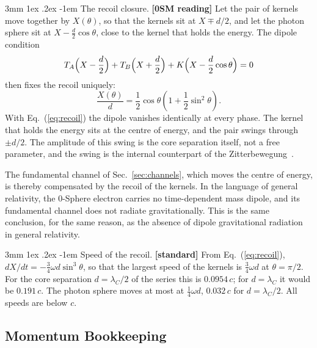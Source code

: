 \documentclass[%
 reprint, amsmath,amssymb, aps, prb, ]{revtex4-2}
\makeatletter
\numberwithin{equation}{section}
\renewcommand\paragraph{%
  \@startsection{paragraph}{4}{\z@}%
    {3mm \@plus 1ex \@minus .2ex}%
    {-1em}%
    {\normalfont\normalsize\itshape}}
\makeatother
\begin{document}
\paragraph{The recoil closure.} \textbf{[0SM reading]} Let the pair of kernels move together by $X(\theta)$, so that the kernels sit at $X \mp d/2$, and let the photon sphere sit at $X - \tfrac{d}{2}\cos\theta$, close to the kernel that holds the energy. The dipole condition
\begin{equation}
T_A\Bigl(X - \frac d2\Bigr) + T_B\Bigl(X + \frac d2\Bigr) + K\Bigl(X - \frac d2\cos\theta\Bigr) = 0
\label{eq:dipole}
\end{equation}
then fixes the recoil uniquely:
\begin{equation}
\frac{X(\theta)}{d} = \frac12\cos\theta\left(1 + \frac12\sin^2\theta\right).
\label{eq:recoil}
\end{equation}
With Eq.~(\ref{eq:recoil}) the dipole vanishes identically at every phase. The kernel that holds the energy sits at the centre of energy, and the pair swings through $\pm d/2$. The amplitude of this swing is the core separation itself, not a free parameter, and the swing is the internal counterpart of the Zitterbewegung~\cite{Schrodinger1930}.

The fundamental channel of Sec.~\ref{sec:channels}, which moves the centre of energy, is thereby compensated by the recoil of the kernels. In the language of general relativity, the 0-Sphere electron carries no time-dependent mass dipole, and its fundamental channel does not radiate gravitationally. This is the same conclusion, for the same reason, as the absence of dipole gravitational radiation in general relativity.

\paragraph{Speed of the recoil.} \textbf{[standard]} From Eq.~(\ref{eq:recoil}), $dX/dt = -\tfrac34\omega d\sin^3\theta$, so that the largest speed of the kernels is $\tfrac34\omega d$ at $\theta = \pi/2$. For the core separation $d = \lambda_C/2$ of the series this is $0.0954\,c$; for $d = \lambda_C$ it would be $0.191\,c$. The photon sphere moves at most at $\tfrac14\omega d$, $0.032\,c$ for $d = \lambda_C/2$. All speeds are below $c$.

\subsection{Momentum Bookkeeping}
\label{sec:bookkeeping}
\end{document}
